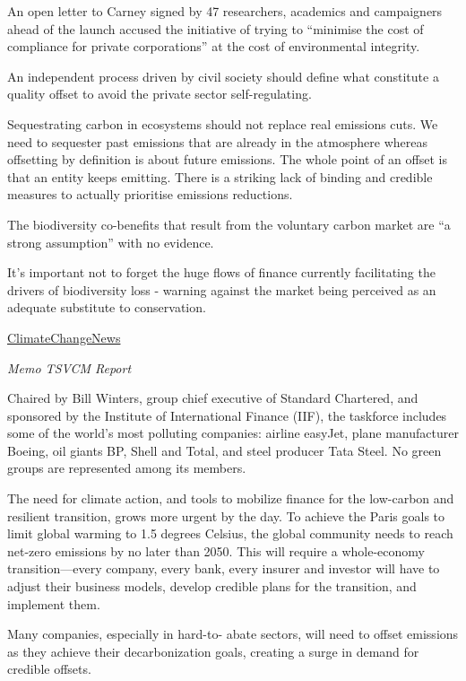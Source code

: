 \documentclass[
]{book}
\begin{document}
An open letter to Carney signed by 47 researchers, academics and campaigners ahead of the launch accused the initiative of trying to ``minimise the cost of compliance for private corporations'' at the cost of environmental integrity.

An independent process driven by civil society should define what constitute a quality offset to avoid the private sector self-regulating.

Sequestrating carbon in ecosystems should not replace real emissions cuts.
We need to sequester past emissions that are already in the atmosphere whereas offsetting by definition is about future emissions. The whole point of an offset is that an entity keeps emitting. There is a striking lack of binding and credible measures to actually prioritise emissions reductions.

The biodiversity co-benefits that result from the voluntary carbon market are ``a strong assumption'' with no evidence.

It's important not to forget the huge flows of finance currently facilitating the drivers of biodiversity loss - warning against the market being perceived as an adequate substitute to conservation.

\href{https://www.climatechangenews.com/2021/01/27/carneys-carbon-offset-taskforce-ducks-environmental-integrity-questions/}{ClimateChangeNews}

\emph{Memo TSVCM Report}

Chaired by Bill Winters, group chief executive of Standard Chartered, and sponsored by the Institute of International Finance (IIF), the taskforce includes some of the world's most polluting companies: airline easyJet, plane manufacturer Boeing, oil giants BP, Shell and Total, and steel producer Tata Steel. No green groups are represented among its members.

The need for climate action, and tools to
mobilize finance for the low-carbon and
resilient transition, grows more urgent by the
day. To achieve the Paris goals to limit global
warming to 1.5 degrees Celsius, the global
community needs to reach net-zero emissions
by no later than 2050. This will require a
whole-economy transition---every company,
every bank, every insurer and investor
will have to adjust their business models,
develop credible plans for the transition, and
implement them.

Many companies, especially in hard-to-
abate sectors, will need to offset emissions
as they achieve their decarbonization goals,
creating a surge in demand for credible
offsets.
\end{document}

